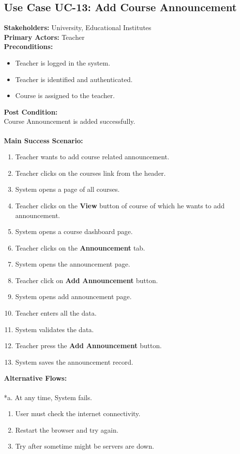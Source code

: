 \subsection{Use Case UC-13: Add Course Announcement}
\textbf{Stakeholders: } University, Educational Institutes \\
\textbf{Primary Actors: }Teacher \\
\textbf{Preconditions:}
\begin{itemize}
\item Teacher is logged in the system.
\item Teacher is identified and authenticated.
\item Course is assigned to the teacher.
\end{itemize}
\textbf{Post Condition: }\\
Course Announcement is added successfully.\\
\\
\textbf{Main Success Scenario:}
\begin{enumerate}
\item Teacher wants to add course related announcement.
\item Teacher clicks on the courses link from the header.
\item System opens a page of all courses.
\item Teacher clicks on the \textbf{View} button of course of which he wants to add announcement.
\item System opens a course dashboard page.
\item Teacher clicks on the \textbf{Announcement} tab.
\item System opens the announcement page.
\item Teacher click on \textbf{Add Announcement} button.
\item System opens add announcement page.
\item Teacher enters all the data.
\item System validates the data.
\item Teacher press the \textbf{Add Announcement} button.
\item System saves the announcement record.
\end{enumerate}
\textbf{Alternative Flows:}\\
\\
*a. At any time, System fails.
\begin{enumerate}
\item User must check the internet connectivity.
\item Restart the browser and try again.
\item Try after sometime might be servers are down.
\end{enumerate}
